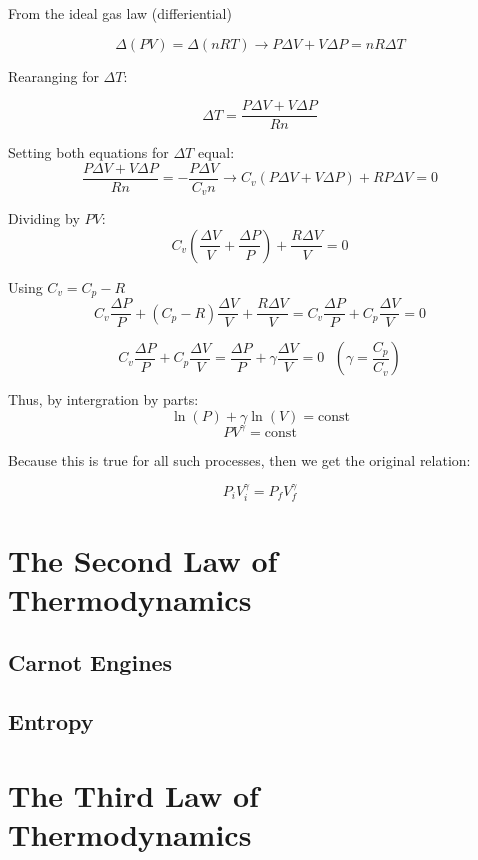 \documentclass[12pt, a4paper]{article}
\theoremstyle{definition}
\begin{document}
From the ideal gas law (differiential)

\[\Delta (PV) = \Delta (nRT) \rightarrow P\Delta V + V \Delta P = nR \Delta T\]

Rearanging for $\Delta T$:

\[\Delta T = \frac{P\Delta V + V \Delta P}{Rn}\]

Setting both equations for $\Delta T$ equal:
\[\frac{P\Delta V + V \Delta P}{Rn} = -\frac{P \Delta V}{C_v n} \rightarrow C_v (P\Delta V + V\Delta P) + RP \Delta V = 0\]

Dividing by $PV$:
\[C_v (\frac{\Delta V}{V} + \frac{\Delta P}{P}) + \frac{R\Delta V}{V} = 0\]

Using $C_v = C_p - R$
\[C_v \frac{\Delta P}{P} + (C_p - R)\frac{\Delta V}{V} + \frac{R\Delta V}{V} = C_v \frac{\Delta P}{P} + C_p \frac{\Delta V}{V} = 0\]

\[C_v \frac{\Delta P}{P} + C_p \frac{\Delta V}{V} = \frac{\Delta P}{P} + \gamma \frac{\Delta V}{V} = 0 \textrm{ } (\gamma = \frac{C_p}{C_v})\] %

Thus, by intergration by parts:
\[\ln(P) + \gamma \ln(V) = \textrm{const}\]
\[PV^{\gamma} = \textrm{const}\]

Because this is true for all such processes, then we get the original relation:

\[P_i V_i^\gamma = P_f V_f^\gamma\]

\section{The Second Law of Thermodynamics}

\subsection{Carnot Engines}

\subsection{Entropy}

\section{The Third Law of Thermodynamics}
\end{document}
